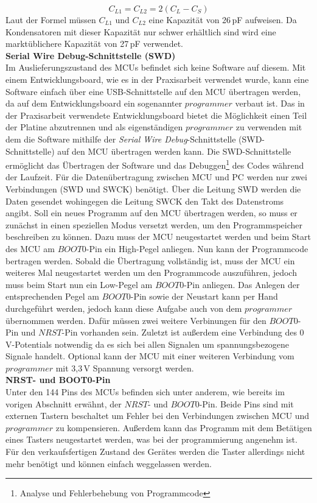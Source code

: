 \begin{equation}
	C_{L1} =  C_{L2} = 2(C_L - C_S)
\end{equation}
Laut der Formel müssen $C_{L1}$ und $C_{L2}$ eine Kapazität von 26\,pF aufweisen. Da Kondensatoren mit dieser Kapazität nur schwer erhältlich sind wird eine marktüblichere Kapazität von 27\,pF verwendet.\\
\textbf{Serial Wire Debug-Schnittstelle (SWD)}\\
Im Auslieferungszustand des MCUs befindet sich keine Software auf diesem. Mit einem Entwicklungsboard, wie es in der Praxisarbeit verwendet wurde, kann eine Software einfach über eine USB-Schnittstelle auf den MCU übertragen werden, da auf dem Entwicklungsboard ein sogenannter $programmer$ verbaut ist. Das in der Praxisarbeit verwendete Entwicklungsboard bietet die Möglichkeit einen Teil der Platine abzutrennen und als eigenständigen $programmer$ zu verwenden mit dem die Software mithilfe der \textit{Serial Wire Debug}-Schnittstelle (SWD-Schnittstelle) auf den MCU übertragen werden kann. Die SWD-Schnittstelle ermöglicht das Übertragen der Software und das Debuggen\footnote{Analyse und Fehlerbehebung von Programmcode} des Codes während der Laufzeit. Für die Datenübertragung zwischen MCU und PC werden nur zwei Verbindungen (SWD und SWCK) benötigt. Über die Leitung SWD werden die Daten gesendet wohingegen die Leitung SWCK den Takt des Datenstroms angibt. Soll ein neues Programm auf den MCU übertragen werden, so muss er zunächst in einen speziellen Modus versetzt werden, um den Programmspeicher beschreiben zu können. Dazu muss der MCU neugestartet werden und beim Start des MCU am $BOOT0$-Pin ein High-Pegel anliegen. Nun kann der Programmcode bertragen werden. Sobald die Übertragung vollständig ist, muss der MCU ein weiteres Mal neugestartet werden um den Programmcode auszuführen, jedoch muss beim Start nun ein Low-Pegel am $BOOT0$-Pin anliegen. Das Anlegen der entsprechenden Pegel am $BOOT0$-Pin sowie der Neustart kann per Hand durchgeführt werden, jedoch kann diese Aufgabe auch von dem $programmer$ übernommen werden. Dafür müssen zwei weitere Verbinungen für den $BOOT0$-Pin und $NRST$-Pin vorhanden sein. Zuletzt ist außerdem eine Verbindung des 0\,V-Potentials notwendig da es sich bei allen Signalen um spannungsbezogene Signale handelt. Optional kann der MCU mit einer weiteren Verbindung vom $programmer$ mit 3,3\,V Spannung versorgt werden.\\
\textbf{NRST- und BOOT0-Pin}\\
Unter den 144 Pins des MCUs befinden sich unter anderem, wie bereits im vorigen Abschnitt erwähnt, der $NRST$- und $BOOT0$-Pin. Beide Pins sind mit externen Tastern beschaltet um Fehler bei den Verbindungen zwischen MCU und $programmer$ zu kompensieren. Außerdem kann das Programm mit dem Betätigen eines Tasters neugestartet werden, was bei der programmierung angenehm ist. Für den verkaufsfertigen Zustand des Gerätes werden die Taster allerdings nicht mehr benötigt und können einfach weggelassen werden. 
